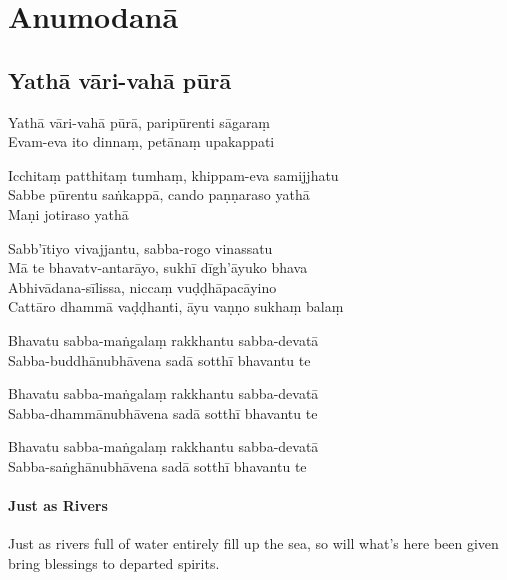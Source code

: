 \chapter{Anumodanā}

\section{Yathā vāri-vahā pūrā}


Yathā vāri-vahā pūrā, paripūrenti sāgaraṃ\\
Evam-eva ito dinnaṃ, petānaṃ upakappati


Icchitaṃ patthitaṃ tumhaṃ, khippam-eva samijjhatu\\
Sabbe pūrentu saṅkappā, cando paṇṇaraso yathā\\
Maṇi jotiraso yathā



Sabb'ītiyo vivajjantu, sabba-rogo vinassatu\\
Mā te bhavatv-antarāyo, sukhī dīgh'āyuko bhava\\
Abhivādana-sīlissa, niccaṃ vuḍḍhāpacāyino\\
Cattāro dhammā vaḍḍhanti, āyu vaṇṇo sukhaṃ balaṃ



Bhavatu sabba-maṅgalaṃ rakkhantu sabba-devatā\\
Sabba-buddhānubhāvena sadā sotthī bhavantu te

Bhavatu sabba-maṅgalaṃ rakkhantu sabba-devatā\\
Sabba-dhammānubhāvena sadā sotthī bhavantu te

Bhavatu sabba-maṅgalaṃ rakkhantu sabba-devatā\\
Sabba-saṅghānubhāvena sadā sotthī bhavantu te

\subsubsection{Just as Rivers}

Just as rivers full of water entirely fill up the sea, so will what's here been
given bring blessings to departed spirits.


